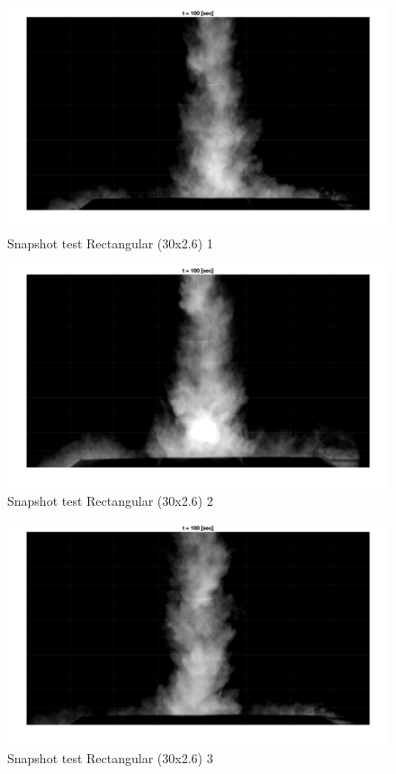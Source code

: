 \begin{figure}[ht!]
    \centering
    \includegraphics[width=\linewidth]{Images/Rec30_1_t100.jpg}
    \caption{Snapshot test Rectangular (30x2.6) 1}
\end{figure}

\begin{figure}[ht!]
    \centering
    \includegraphics[width=\linewidth]{Images/Rec30_2_t100.jpg}
    \caption{Snapshot test Rectangular (30x2.6) 2}
\end{figure}

\begin{figure}[ht!]
    \centering
    \includegraphics[width=\linewidth]{Images/Rec30_3_t100.jpg}
    \caption{Snapshot test Rectangular (30x2.6) 3}
\end{figure}

